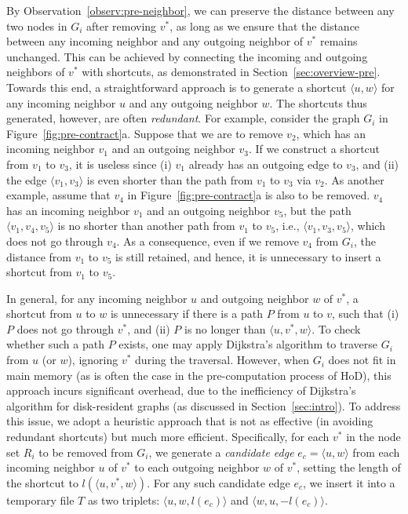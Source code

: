 \documentclass{sig-alternate}
\def\v{v^*}
\begin{document}
\begin{sloppy}
By Observation~\ref{observ:pre-neighbor}, we can preserve the distance between any two nodes in $G_i$ after removing $\v$, as long as we ensure that the distance between any incoming neighbor and any outgoing neighbor of $\v$ remains unchanged. This can be achieved by connecting the incoming and outgoing neighbors of $\v$ with shortcuts, as demonstrated in Section~\ref{sec:overview-pre}. Towards this end, a straightforward approach is to generate a shortcut $\langle u, w\rangle$ for any incoming neighbor $u$ and any outgoing neighbor $w$. The shortcuts thus generated, however, are often {\em redundant}. For example, consider the graph $G_i$ in Figure~\ref{fig:pre-contract}a. Suppose that we are to remove $v_2$, which has an incoming neighbor $v_1$ and an outgoing neighbor $v_3$. If we construct a shortcut from $v_1$ to $v_3$, it is useless since (i) $v_1$ already has an outgoing edge to $v_3$, and (ii) the edge $\langle v_1, v_3\rangle$ is even shorter than the path from $v_1$ to $v_3$ via $v_2$. As another example, assume that $v_4$ in Figure~\ref{fig:pre-contract}a is also to be removed. $v_4$ has an incoming neighbor $v_1$ and an outgoing neighbor $v_5$, but the path $\langle v_1, v_4, v_5\rangle$ is no shorter than another path from $v_1$ to $v_5$, i.e., $\langle v_1, v_3, v_5\rangle$, which does not go through $v_4$. As a consequence, even if we remove $v_4$ from $G_i$, the distance from $v_1$ to $v_5$ is still retained, and hence, it is unnecessary to insert a shortcut from $v_1$ to $v_5$.


In general, for any incoming neighbor $u$ and outgoing neighbor $w$ of $\v$, a shortcut from $u$ to $w$ is unnecessary if there is a path $P$ from $u$ to $v$, such that (i) $P$ does not go through $\v$, and (ii) $P$ is no longer than $\langle u, \v, w\rangle$. To check whether such a path $P$ exists, one may apply Dijkstra's algorithm to traverse $G_i$ from $u$ (or $w$), ignoring $\v$ during the traversal. However, when $G_i$ does not fit in main memory (as is often the case in the pre-computation process of HoD), this approach incurs significant overhead, due to the inefficiency of Dijkstra's algorithm for disk-resident graphs (as discussed in Section~\ref{sec:intro}). To address this issue, we adopt a heuristic approach that is not as effective (in avoiding redundant shortcuts) but much more efficient. Specifically, for each $\v$ in the node set $R_i$ to be removed from $G_i$, we generate a {\em candidate edge} $e_c = \langle u, w\rangle$ from each incoming neighbor $u$ of $\v$ to each outgoing neighbor $w$ of $\v$, setting the length of the shortcut to $l(\langle u, \v, w\rangle)$. For any such candidate edge $e_c$, we insert it into a temporary file $T$ as two triplets: $\langle u, w, l(e_c)\rangle$ and $\langle w, u, -l(e_c)\rangle$.


\end{sloppy}
\end{document}
